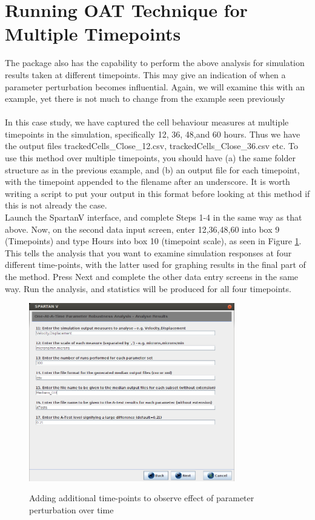 \documentclass[a4paper,11pt]{article}
\begin{document}
\section{Running OAT Technique for Multiple Timepoints}
\noindent The package also has the capability to perform the above analysis for simulation results taken at different timepoints. This may give an indication of when a parameter perturbation becomes influential.  Again, we will examine this with an example, yet there is not much to change from the example seen previously\\
\\
In this case study, we have captured the cell behaviour measures at multiple timepoints in the simulation, specifically 12, 36, 48,and 60 hours. Thus we have the output files trackedCells\_Close\_12.csv, trackedCells\_Close\_36.csv etc. To use this method over multiple timepoints, you should have (a) the same folder structure as in the previous example, and (b) an output file for each timepoint, with the timepoint appended to the filename after an underscore. It is worth writing a script to put your output in this format before looking at this method if this is not already the case.
\\
Launch the SpartanV interface, and complete Steps 1-4 in the same way as that above. Now, on the second data input screen, enter 12,36,48,60 into box 9 (Timepoints) and type Hours into box 10 (timepoint scale), as seen in Figure \ref{OAT_Screen5}. This tells the analysis that you want to examine simulation responses at four different time-points, with the latter used for graphing results in the final part of the method. Press Next and complete the other data entry screens in the same way. Run the analysis, and statistics will be produced for all four timepoints.

\begin{figure}
\centering
    \includegraphics[width=0.8\textwidth]{SpartanV_OAT4.png}\\ \noindent
    \caption{Adding additional time-points to observe effect of parameter perturbation over time}
    \label{OAT_Screen5}
    \newpage 
\end{figure}
\end{document}
